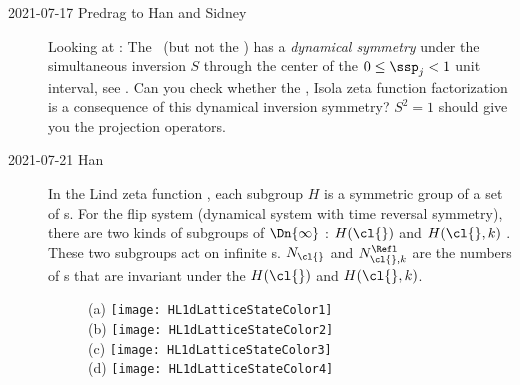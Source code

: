 \begin{description}
\item[2021-07-17 Predrag to Han and Sidney]
Looking at :
The \templatt\ (but not the \henlatt) has a \emph{dynamical symmetry}
under the simultaneous inversion $S$ through the center of the
\(0\leq\ssp_j<1\) unit interval, see . Can you check
whether the ,  Isola zeta function
factorization is a consequence of this dynamical inversion symmetry?
$S^2=1$ should give you the projection operators.

\item[2021-07-21 Han]
In the Lind zeta function , each subgroup $H$ is a symmetric
group of a set of {\lattstate}s. For the flip system (dynamical system with time
reversal symmetry), there are two kinds of subgroups of $\Dn{\infty}$ :
$H(\cl{})$ and $H(\cl{},k)$ . These two subgroups act
on infinite {\lattstate}s. $N_{\cl{}}$ and $N^{\Refl}_{\cl{},k}$ are the numbers of
{\lattstate}s that are invariant under the $H(\cl{})$ and $H(\cl{},k)$.

\begin{figure}
  \centering
{(a)}
\texttt{[image: HL1dLatticeStateColor1]}
\\
{(b)}
\texttt{[image: HL1dLatticeStateColor2]}
\\ %
{(c)}
\texttt{[image: HL1dLatticeStateColor3]}
\\
{(d)}
\texttt{[image: HL1dLatticeStateColor4]}


\end{figure}
\end{description}
